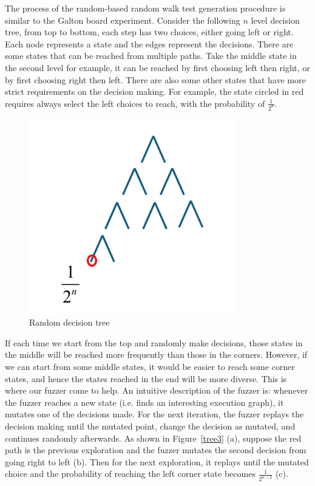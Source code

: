The process of the random-based random walk test generation procedure is similar to the Galton board experiment. Consider the following $n$ level decision tree, from top to bottom, each step has two choices, either going left or right. Each node represents a state and the edges represent the decisions. There are some states that can be reached from multiple paths. Take the middle state in the second level for example, it can be reached by first choosing left then right, or by first choosing right then left. There are also some other states that have more strict requirements on the decision making. For example, the state circled in red requires always select the left choices to reach, with the probability of $\frac{1}{2^n}$. 
\begin{figure}[htbp] %
    \centering
    \includegraphics[scale=0.5]{figure/tree.pdf} %
    \caption{Random decision tree} %
    \label{tree} %
\end{figure}

If each time we start from the top and randomly make decisions, those states in the middle will be reached more frequently than those in the corners. However, if we can start from some middle states, it would be easier to reach some corner states, and hence the states reached in the end will be more diverse. This is where our fuzzer come to help. An intuitive description of the fuzzer is: whenever the fuzzer reaches a new state (i.e. finds an interesting execution graph), it mutates one of the decisions made. For the next iteration, the fuzzer replays the decision making until the mutated point, change the decision as mutated, and continues randomly afterwards. As shown in Figure~\ref{tree3} (a), suppose the red path is the previous exploration and the fuzzer mutates the second decision from going right to left (b). Then for the next exploration, it replays until the mutated choice and the probability of reaching the left corner state becomes $\frac{1}{2^{n-2}}$ (c). 

